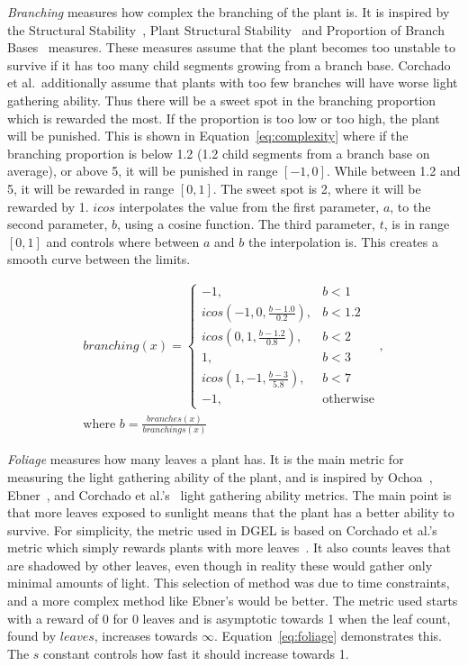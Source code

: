 \textit{Branching} measures how complex the branching of the plant is.
It is inspired by the Structural Stability~\cite{1998Ochoa}, Plant Structural Stability~\cite{2009Corchado} and Proportion of Branch Bases~\cite{1998Ochoa} measures.
These measures assume that the plant becomes too unstable to survive if it has too many child segments growing from a branch base.
Corchado et al.\ additionally assume that plants with too few branches will have worse light gathering ability.
Thus there will be a sweet spot in the branching proportion which is rewarded the most.
If the proportion is too low or too high, the plant will be punished.
This is shown in Equation~\ref{eq:complexity} where if the branching proportion is below 1.2 (1.2 child segments from a branch base on average), or above 5, it will be punished in range $[-1, 0]$.
While between 1.2 and 5, it will be rewarded in range $[0, 1]$.
The sweet spot is 2, where it will be rewarded by 1.
$icos$ interpolates the value from the first parameter, $a$, to the second parameter, $b$, using a cosine function.
The third parameter, $t$, is in range $[0, 1]$ and controls where between $a$ and $b$ the interpolation is.
This creates a smooth curve between the limits.

\begin{equation}
\label{eq:complexity}
\begin{aligned}
    branching(x) =
    \begin{cases}
        -1, & b < 1 \\
        icos(-1, 0, \frac{b - 1.0}{0.2}), & b < 1.2 \\
        icos(0, 1, \frac{b - 1.2}{0.8}), & b < 2 \\
        1, & b < 3 \\
        icos(1, -1, \frac{b - 3}{5.8}), & b < 7 \\
        -1, & \text{otherwise}
    \end{cases}, \\
    \text{where } b = \frac{branches(x)}{branchings(x)}
\end{aligned}
\end{equation}

\textit{Foliage} measures how many leaves a plant has.
It is the main metric for measuring the light gathering ability of the plant, and is inspired by Ochoa~\cite{1998Ochoa}, Ebner~\cite{2003Ebner}, and Corchado et al.'s~\cite{2009Corchado} light gathering ability metrics.
The main point is that more leaves exposed to sunlight means that the plant has a better ability to survive.
For simplicity, the metric used in \gls{DGEL} is based on Corchado et al.'s metric which simply rewards plants with more leaves~\cite{2009Corchado}.
It also counts leaves that are shadowed by other leaves, even though in reality these would gather only minimal amounts of light.
This selection of method was due to time constraints, and a more complex method like Ebner's would be better.
The metric used starts with a reward of 0 for 0 leaves and is asymptotic towards 1 when the leaf count, found by $leaves$, increases towards $\infty$.
Equation~\ref{eq:foliage} demonstrates this.
The $s$ constant controls how fast it should increase towards 1.

